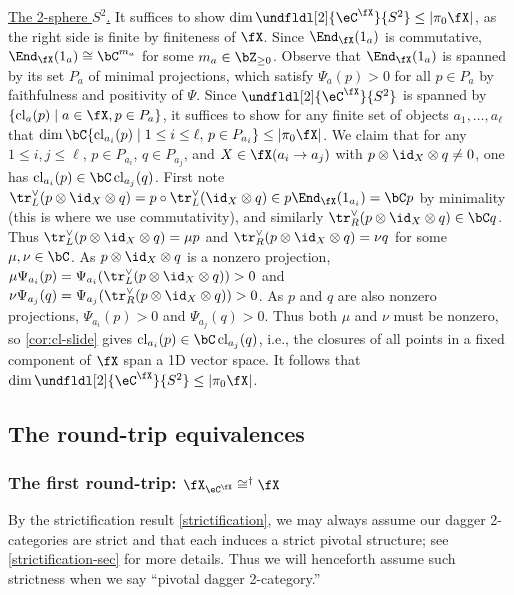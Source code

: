 \documentclass[12pt,reqno]{amsart}
\newcommand{\cl}{\mathrm{cl}}
\newcommand{\C}{\eC}
\newcommand{\itemstep}[1]{\smallskip\noindent\underline{#1}}
\begin{document}
\begin{pf}
\itemstep{The 2-sphere $S^2$.}
It suffices to show $\dim\undfldl[2]{\C^\fX}{S^2}\leq|\pi_0\fX|$, as the right side is finite by finiteness of $\fX$. Since $\End_\fX(1_a)$ is commutative, $\End_\fX(1_a)\cong\bC^{m_a}$ for some $m_a\in\bZ_{\geq 0}$. Observe that $\End_\fX(1_a)$ is spanned by its set $P_a$ of minimal projections, which satisfy $\Psi_a(p)>0$ for all $p\in P_a$ by faithfulness and positivity of $\Psi$. Since $\undfldl[2]{\C^\fX}{S^2}$ is spanned by $\{\cl_a(p)\mid a\in\fX,p\in P_a\}$, it suffices to show for any finite set of objects $a_1,\dots,a_\ell$ that $\dim\bC\{\cl_{a_i}(p)\mid 1\leq i\leq\ell,\,p\in P_{a_i}\}\leq|\pi_0\fX|$.
We claim that for any $1\leq i,j\leq \ell$, $p\in P_{a_i}$, $q\in P_{a_j}$, and $X\in\fX(a_i\to a_j)$ with $p\otimes\id_X\otimes q\neq 0$, one has $\cl_{a_i}(p)\in\bC\,\cl_{a_j}(q)$. First note $\tr^\vee_L(p\otimes \id_X\otimes q)=p\circ\tr^\vee_L(\id_X\otimes q)\in p\End_\fX(1_{a_i})=\bC p$ by minimality (this is where we use commutativity), and similarly $\tr^\vee_R(p\otimes \id_X\otimes q)\in\bC q$. Thus $\tr^\vee_L(p\otimes \id_X\otimes q)=\mu p$ and $\tr^\vee_R(p\otimes \id_X\otimes q)=\nu q$ for some $\mu,\nu\in\bC$. As $p\otimes \id_X\otimes q$ is a nonzero projection, $\mu\Psi_{a_i}(p)=\Psi_{a_i}(\tr^\vee_L(p\otimes \id_X\otimes q))>0$ and $\nu\Psi_{a_{j}}(q)=\Psi_{a_j}(\tr^\vee_R(p\otimes \id_X\otimes q))>0$. As $p$ and $q$ are also nonzero projections, $\Psi_{a_i}(p)>0$ and $\Psi_{a_{j}}(q)>0$. Thus both $\mu$ and $\nu$ must be nonzero, so \cref{cor:cl-slide} gives $\cl_{a_i}(p)\in\bC\,\cl_{a_{j}}(q)$, i.e., the closures of all points in a fixed component of $\fX$ span a 1D vector space. It follows that $\dim\undfldl[2]{\C^\fX}{S^2}\leq |\pi_0\fX|$.
\end{pf}

\subsection{The round-trip equivalences}

\subsubsection{The first round-trip: \texorpdfstring{$\fX_{\C^\fX}\cong^\dag\fX$}{X(C(X)) = X}}

\begin{convention} 
\label{strictnessconvention}
By the strictification result \cref{strictification}, we may always assume our dagger 2-categories are strict and that each induces a strict pivotal structure; see \cref{strictification-sec} for more details. Thus we will henceforth assume such strictness when we say ``pivotal dagger 2-category.''
\end{convention}
\end{document}
